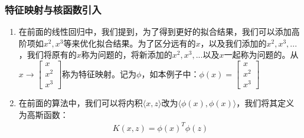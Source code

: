 \subsubsection{特征映射与核函数引入}
\begin{enumerate}
	\item 在前面的线性回归中，我们提到，为了得到更好的拟合结果，我们可以添加高阶项如$x^2, x^3$等来优化拟合结果。为了区分远有的$x$，以及我们添加的$x^2, x^3, ...$，我们将原有的$x$称为问题的{\color{blue}{属性}}，将新添加的$x^2, x^3,...$以及$x$一起称为问题的{\color{blue}{特征}}。从$x \to \left[\begin{matrix}x \\ x^2 \\ x^3\end{matrix}\right]$称为特征映射。记为$\phi$，如本例子中：$\phi(x) = \left[\begin{matrix}x \\ x^2 \\ x^3\end{matrix}\right]$

	\item 在前面的算法中，我们可以将内积$\langle x, z \rangle$改为$\langle \phi(x), \phi(x) \rangle$，我们将其定义为高斯函数：
	\begin{align}
		K(x, z) = \phi(x)^T \phi(z)
	\end{align}


\end{enumerate}
